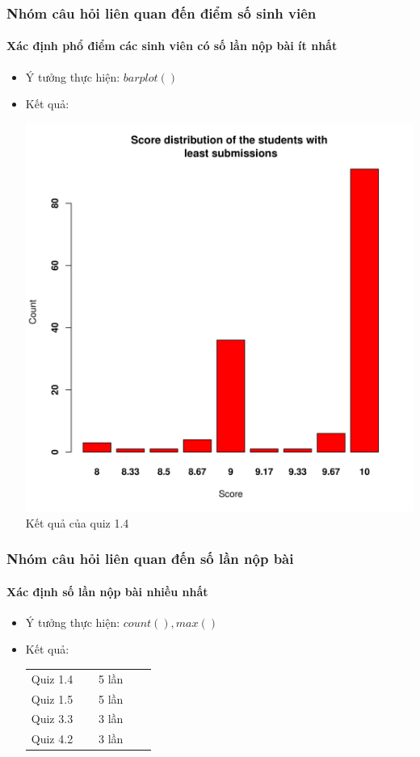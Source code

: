 \documentclass[english,10pt,table]{beamer}
\begin{document}
\frame
{
\frametitle{Nhóm câu hỏi liên quan đến điểm số sinh viên}
\framesubtitle{Xác định phổ điểm các sinh viên có số lần nộp bài ít nhất}
\begin{itemize}
    \item Ý tưởng thực hiện: $barplot()$
    \item Kết quả:\\
    \begin{center}
        \includegraphics[width = 6 cm]{Images/img3-1-1.jpg}\\
        Kết quả của quiz 1.4
    \end{center}
\end{itemize}
}

\frame
{
\frametitle{Nhóm câu hỏi liên quan đến số lần nộp bài}
\framesubtitle{Xác định số lần nộp bài nhiều nhất}
\begin{itemize}
    \item Ý tưởng thực hiện: $count(), max()$
    \item Kết quả:\\
    \begin{center}
        \begin{tabular}{l l c c c}
             Quiz 1.4 & $\;$ & 5 lần\\
             Quiz 1.5 & $\;$ & 5 lần\\
             Quiz 3.3 & $\;$ & 3 lần\\
             Quiz 4.2 & $\;$ & 3 lần
        \end{tabular}
    \end{center}
\end{itemize}
}
\end{document}
